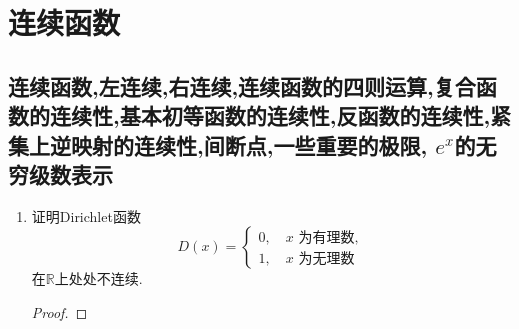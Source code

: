\section{连续函数}
\subsection{连续函数,左连续,右连续,连续函数的四则运算,复合函数的连续性,基本初等函数的连续性,反函数的连续性,紧集上逆映射的连续性,间断点,一些重要的极限, \(e^x\)的无穷级数表示}
\begin{2a}
\begin{enumerate}
\item 证明Dirichlet函数\[D(x)=\begin{cases}
    0,\quad x\text{ 为有理数},\\
    1,\quad x\text{ 为无理数}
\end{cases}\]在\(\mathbb{R}\)上处处不连续.
\begin{proof}


\end{proof}
\end{enumerate}
\end{2a}
